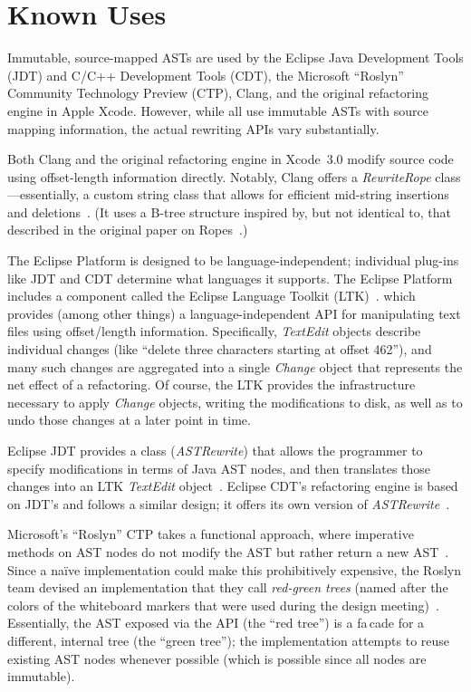 \documentclass[prodmode]{acmlarge}
\begin{document}

\section{Known Uses}

Immutable, source-mapped ASTs are used by the Eclipse Java Development Tools
(JDT) and C/C++ Development Tools (CDT), the Microsoft ``Roslyn'' Community
Technology Preview (CTP), Clang, and the original refactoring engine in Apple
Xcode.  However, while all use immutable ASTs with source mapping information,
the actual rewriting APIs vary substantially.  

Both Clang and the original refactoring engine in Xcode~3.0 modify source code
using offset-length information directly.  Notably, Clang offers a
\textit{RewriteRope} class---essentially, a custom string class that allows for
efficient mid-string insertions and deletions~\cite{clang-rewriterope}.
(It uses a B-tree structure inspired by, but not identical to, that described
in the original paper on Ropes~\cite{boehm95ropes}.)
 
The Eclipse Platform is designed to be language-independent; individual
plug-ins like JDT and CDT determine what languages it supports.  The Eclipse
Platform includes a component called the Eclipse Language Toolkit
(LTK)~\cite{ltk}.  which provides (among other things) a language-independent
API for manipulating text files using offset/length information.  Specifically,
\textit{TextEdit} objects describe individual changes (like ``delete three
characters starting at offset 462''), and many such changes are aggregated into
a single \textit{Change} object that represents the net effect of a
refactoring.  Of course, the LTK provides the infrastructure necessary to apply
\textit{Change} objects, writing the modifications to disk, as well as to undo
those changes at a later point in time.

Eclipse JDT provides a class (\textit{ASTRewrite}) that allows the programmer
to specify modifications in terms of Java AST nodes, and then translates those
changes into an LTK \textit{TextEdit} object~\cite{jdt-astrewrite}.  Eclipse
CDT's refactoring engine is based on JDT's and follows a similar design; it
offers its own version of \textit{ASTRewrite}~\cite{cdt-refactoring}.

Microsoft's ``Roslyn'' CTP takes a functional approach, where imperative
methods on AST nodes do not modify the AST but rather return a new
AST~\cite{vogel12roslyn}.  Since a na\"{i}ve implementation could make this
prohibitively expensive, the Roslyn team devised an implementation that
they call \textit{red-green trees} (named after the colors of the
whiteboard markers that were used during the design
meeting)~\cite{lippert12persistence}.  Essentially, the AST exposed via the API
(the ``red tree'') is a fa\,{c}ade for a different, internal tree (the ``green
tree''); the implementation attempts to reuse existing AST nodes whenever
possible (which is possible since all nodes are immutable).
\end{document}
